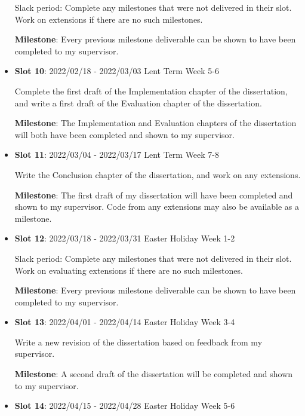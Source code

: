 \documentclass[12pt]{article}
\begin{document}
\begin{itemize}
Slack period: Complete any milestones that were not delivered in their slot. Work on extensions if there are no such milestones.

\textbf{Milestone}: Every previous milestone deliverable can be shown to have been completed to my supervisor.

\item
  \textbf{Slot 10}: 2022/02/18 - 2022/03/03 \hspace*{\fill}Lent Term Week 5-6

Complete the first draft of the Implementation chapter of the dissertation, and write a first draft of the Evaluation chapter of the dissertation.

\textbf{Milestone}: The Implementation and Evaluation chapters of the dissertation will both have been completed and shown to my supervisor.

\item
  \textbf{Slot 11}: 2022/03/04 - 2022/03/17 \hspace*{\fill}Lent Term Week 7-8

Write the Conclusion chapter of the dissertation, and work on any extensions.

\textbf{Milestone}: The first draft of my dissertation will have been completed and shown to my supervisor. Code from any extensions may also be available as a milestone.

\item
  \textbf{Slot 12}: 2022/03/18 - 2022/03/31 \hspace*{\fill}Easter Holiday Week 1-2

Slack period: Complete any milestones that were not delivered in their slot. Work on evaluating extensions if there are no such milestones.

\textbf{Milestone}: Every previous milestone deliverable can be shown to have been completed to my supervisor.

\item
  \textbf{Slot 13}: 2022/04/01 - 2022/04/14 \hspace*{\fill}Easter Holiday Week 3-4

Write a new revision of the dissertation based on feedback from my supervisor.

\textbf{Milestone}: A second draft of the dissertation will be completed and shown to my supervisor.

\item
  \textbf{Slot 14}: 2022/04/15 - 2022/04/28 \hspace*{\fill}Easter Holiday Week 5-6


\end{itemize}
\end{document}

